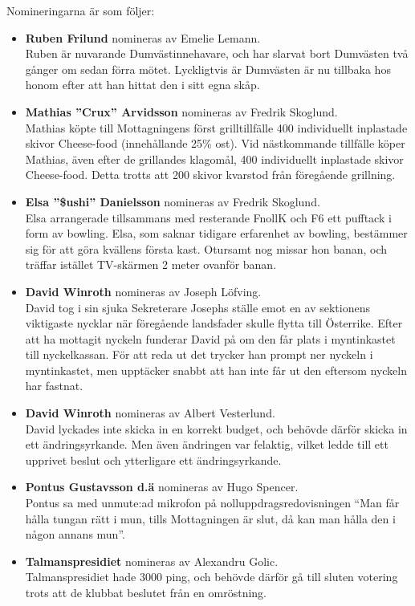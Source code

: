 \documentclass[hidelinks]{sektionsmote}
\begin{document}
\noindent Nomineringarna är som följer:
\begin{itemize}
\item \textbf{Ruben Frilund} nomineras av Emelie Lemann.\\
Ruben är nuvarande Dumvästinnehavare, och har slarvat bort Dumvästen två gånger om sedan förra mötet.
Lyckligtvis är Dumvästen är nu tillbaka hos honom efter att han hittat den i sitt egna skåp.

\item \textbf{Mathias ''Crux'' Arvidsson} nomineras av Fredrik Skoglund.\\
Mathias köpte till Mottagningens först grilltillfälle 400 individuellt inplastade skivor Cheese-food (innehållande 25\% ost).
Vid nästkommande tillfälle köper Mathias, även efter de grillandes klagomål, 400 individuellt inplastade skivor Cheese-food.
Detta trotts att 200 skivor kvarstod från föregående grillning.

\item \textbf{Elsa ''\$ushi'' Danielsson} nomineras av Fredrik Skoglund.\\
Elsa arrangerade tillsammans med resterande FnollK och F6 ett pufftack i form av bowling.
Elsa, som saknar tidigare erfarenhet av bowling, bestämmer sig för att göra kvällens första kast.
Otursamt nog missar hon banan, och träffar istället TV-skärmen 2 meter ovanför banan.

\item \textbf{David Winroth} nomineras av Joseph Löfving.\\
David tog i sin sjuka Sekreterare Josephs ställe emot en av sektionens viktigaste nycklar när föregående landsfader skulle flytta till Österrike.
Efter att ha mottagit nyckeln funderar David på om den får plats i myntinkastet till nyckelkassan.
För att reda ut det trycker han prompt ner nyckeln i myntinkastet, men upptäcker snabbt att han inte får ut den eftersom nyckeln har fastnat.

\item \textbf{David Winroth} nomineras av Albert Vesterlund.\\
David lyckades inte skicka in en korrekt budget, och behövde därför skicka in ett ändringsyrkande.
Men även ändringen var felaktig, vilket ledde till ett upprivet beslut och ytterligare ett ändringsyrkande.

\item \textbf{Pontus Gustavsson d.ä} nomineras av Hugo Spencer.\\
Pontus sa med unmute:ad mikrofon på nolluppdragsredovisningen \enquote{Man får hålla tungan rätt i mun, tills Mottagningen är slut, då kan man hålla den i någon annans mun}.

\item \textbf{Talmanspresidiet} nomineras av Alexandru Golic.\\
Talmanspresidiet hade 3000 ping, och behövde därför gå till sluten votering trots att de klubbat beslutet från en omröstning.
\end{itemize}
\end{document}
